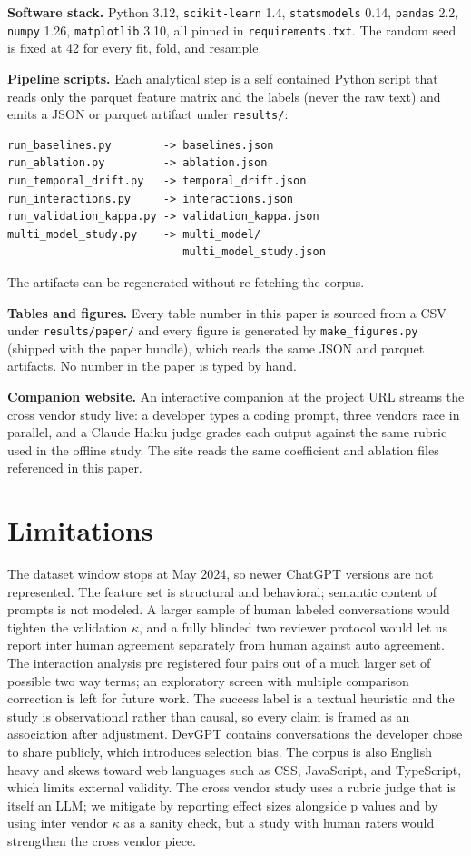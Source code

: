 \documentclass[conference]{IEEEtran}
\begin{document}
\textbf{Software stack.} Python 3.12, \texttt{scikit-learn} 1.4, \texttt{statsmodels} 0.14, \texttt{pandas} 2.2, \texttt{numpy} 1.26, \texttt{matplotlib} 3.10, all pinned in \texttt{requirements.txt}. The random seed is fixed at 42 for every fit, fold, and resample.

\textbf{Pipeline scripts.} Each analytical step is a self contained Python script that reads only the parquet feature matrix and the labels (never the raw text) and emits a JSON or parquet artifact under \texttt{results/}:

\begin{lstlisting}
run_baselines.py        -> baselines.json
run_ablation.py         -> ablation.json
run_temporal_drift.py   -> temporal_drift.json
run_interactions.py     -> interactions.json
run_validation_kappa.py -> validation_kappa.json
multi_model_study.py    -> multi_model/
                           multi_model_study.json
\end{lstlisting}

\noindent The artifacts can be regenerated without re-fetching the corpus.

\textbf{Tables and figures.} Every table number in this paper is sourced from a CSV under \texttt{results/paper/} and every figure is generated by \texttt{make\_figures.py} (shipped with the paper bundle), which reads the same JSON and parquet artifacts. No number in the paper is typed by hand.

\textbf{Companion website.} An interactive companion at the project URL streams the cross vendor study live: a developer types a coding prompt, three vendors race in parallel, and a Claude Haiku judge grades each output against the same rubric used in the offline study. The site reads the same coefficient and ablation files referenced in this paper.

\section{Limitations}\label{sec:limitations}
The dataset window stops at May 2024, so newer ChatGPT versions are not represented. The feature set is structural and behavioral; semantic content of prompts is not modeled. A larger sample of human labeled conversations would tighten the validation $\kappa$, and a fully blinded two reviewer protocol would let us report inter human agreement separately from human against auto agreement. The interaction analysis pre registered four pairs out of a much larger set of possible two way terms; an exploratory screen with multiple comparison correction is left for future work. The success label is a textual heuristic and the study is observational rather than causal, so every claim is framed as an association after adjustment. DevGPT contains conversations the developer chose to share publicly, which introduces selection bias. The corpus is also English heavy and skews toward web languages such as CSS, JavaScript, and TypeScript, which limits external validity. The cross vendor study uses a rubric judge that is itself an LLM; we mitigate by reporting effect sizes alongside p values and by using inter vendor $\kappa$ as a sanity check, but a study with human raters would strengthen the cross vendor piece.
\end{document}
